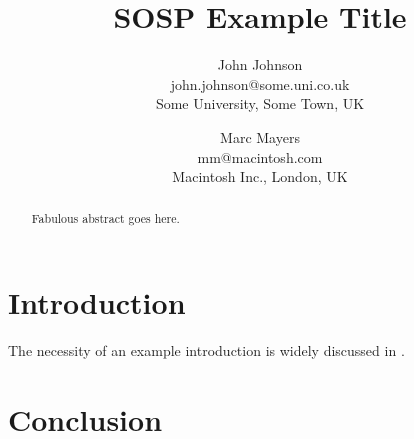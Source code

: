 \documentclass{gistt}
\title{SOSP Example Title}
\author{John Johnson\\
john.johnson@some.uni.co.uk\\
Some University, Some Town, UK
\and
Marc Mayers\\
mm@macintosh.com\\
Macintosh Inc., London, UK}
\begin{document}
\maketitle

\begin{abstract}
Fabulous abstract goes here.
\end{abstract}

%
\section{Introduction}

The necessity of an example introduction is widely discussed in \cite{Johnson:2003,Mayers:2004}.

%
\section{Conclusion}



\printbibliography
\end{document}
